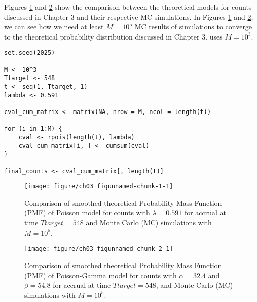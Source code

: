 Figures \ref{fig:3_1} and \ref{fig:3_2} show the comparison between the theoretical models for counts discussed in Chapter 3 and their respective MC simulations. In Figures \ref{fig:3_1} and \ref{fig:3_2}, we can see how we need at least $M=10^5$ MC results of simulations to converge to the theoretical probability distribution discussed in Chapter 3. \cite{carter2004application} uses $M = 10^3$.


\begin{knitrout}
\color{fgcolor}\begin{kframe}
\begin{verbatim}
set.seed(2025)

M <- 10^3
Ttarget <- 548
t <- seq(1, Ttarget, 1)
lambda <- 0.591

cval_cum_matrix <- matrix(NA, nrow = M, ncol = length(t))

for (i in 1:M) {
	cval <- rpois(length(t), lambda)
	cval_cum_matrix[i, ] <- cumsum(cval)
}

final_counts <- cval_cum_matrix[, length(t)]
\end{verbatim}
\end{kframe}
\end{knitrout}


\begin{figure}
\begin{knitrout}
\color{fgcolor}
\texttt{[image: figure/ch03\_figunnamed-chunk-1-1]} 
\end{knitrout}
  \caption{Comparison of smoothed theoretical Probability Mass Function (PMF) of Poisson model for counts with $\lambda = 0.591$ for accrual at time $Ttarget=548$ and Monte Carlo (MC) simulations with $M=10^5$.}
  \label{fig:3_1}
\end{figure}



\begin{figure}
\begin{knitrout}
\color{fgcolor}
\texttt{[image: figure/ch03\_figunnamed-chunk-2-1]} 
\end{knitrout}
\caption{Comparison of smoothed theoretical Probability Mass Function (PMF) of Poisson-Gamma model for counts with $\alpha = 32.4$ and $\beta = 54.8$ for accrual at time $Ttarget=548$, and Monte Carlo (MC) simulations with $M=10^5$.}
\label{fig:3_2}
\end{figure}

